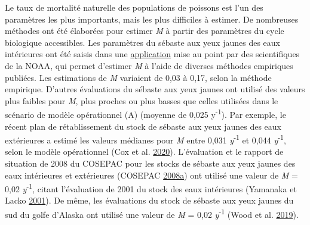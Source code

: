 \documentclass[french,11pt]{book}
\begin{document}
Le taux de mortalité naturelle des populations de poissons est l'un des paramètres les plus importants, mais les plus difficiles à estimer. De nombreuses méthodes ont été élaborées pour estimer \emph{M} à partir des paramètres du cycle biologique accessibles. Les paramètres du sébaste aux yeux jaunes des eaux intérieures ont été saisis dans une \href{http://barefootecologist.com.au/shiny_m.html}{application} mise au point par des scientifiques de la NOAA, qui permet d'estimer \emph{M} à l'aide de diverses méthodes empiriques publiées. Les estimations de \emph{M} variaient de 0,03 à 0,17, selon la méthode empirique. D'autres évaluations du sébaste aux yeux jaunes ont utilisé des valeurs plus faibles pour \emph{M}, plus proches ou plus basses que celles utilisées dans le scénario de modèle opérationnel (A) (moyenne de 0,025 y\textsuperscript{-1}). Par exemple, le récent plan de rétablissement du stock de sébaste aux yeux jaunes des eaux extérieures a estimé les valeurs médianes pour \emph{M} entre 0,031 \emph{y}\textsuperscript{-1} et 0,044 \emph{y}\textsuperscript{-1}, selon le modèle opérationnel (Cox et al. \protect\hyperlink{ref-cox2020}{2020}). L'évaluation et le rapport de situation de 2008 du COSEPAC pour les stocks de sébaste aux yeux jaunes des eaux intérieures et extérieures (COSEPAC \protect\hyperlink{ref-cosewic2008}{2008}\protect\hyperlink{ref-cosewic2008}{a}) ont utilisé une valeur de \emph{M} = 0,02 \emph{y}\textsuperscript{-1}, citant l'évaluation de 2001 du stock des eaux intérieures (Yamanaka et Lacko \protect\hyperlink{ref-yamanaka2001}{2001}). De même, les évaluations du stock de sébaste aux yeux jaunes du sud du golfe d'Alaska ont utilisé une valeur de \emph{M} = 0,02 \emph{y}\textsuperscript{-1} (Wood et al. \protect\hyperlink{ref-wood2019}{2019}).
\end{document}

